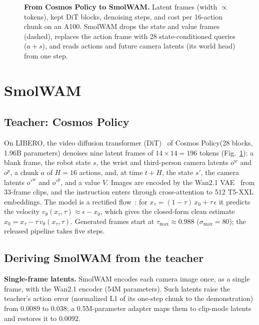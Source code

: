\documentclass{article}
\newcommand{\smol}{SmolWAM\xspace}
\newcommand{\cosmos}{Cosmos Policy\xspace}
\begin{document}
\begin{figure}[t]
\centering
\resizebox{\textwidth}{!}{}
\caption{\textbf{From \cosmos to \smol.} Latent frames (width $\propto$ tokens), kept DiT blocks, denoising steps, and cost per 16-action chunk on an A100. \smol drops the state and value frames (dashed), replaces the action frame with 28 state-conditioned queries ($a{+}s$), and reads actions and future camera latents (its world head) from one step.}
\label{fig:overview}
\end{figure}

\section{SmolWAM}
\label{sec:method}

\subsection{Teacher: Cosmos Policy}

On LIBERO, the video diffusion transformer (DiT)~\citep{peebles2023dit} of \cosmos (28 blocks, 1.96B parameters) denoises nine latent frames of $14{\times}14{=}196$ tokens (Fig.~\ref{fig:overview}): a blank frame, the robot state $s$, the wrist and third-person camera latents $o^{w}$ and $o^{p}$, a chunk $a$ of $H{=}16$ actions, and, at time $t{+}H$, the state $s'$, the camera latents $o'^{w}$ and $o'^{p}$, and a value $V$.
Images are encoded by the Wan2.1 VAE~\citep{wan2025} from 33-frame clips, and the instruction enters through cross-attention to 512 T5-XXL embeddings.
The model is a rectified flow~\citep{liu2023rectifiedflow,lipman2023flowmatching}: for $x_\tau=(1-\tau)\,x_0+\tau\,\epsilon$ it predicts the velocity $v_\theta(x_\tau,\tau)\approx\epsilon-x_0$, which gives the closed-form clean estimate $\hat{x}_0 = x_\tau - \tau\, v_\theta(x_\tau,\tau)$.
Generated frames start at $\tau_{\max}\approx0.988$ ($\sigma_{\max}{=}80$); the released pipeline takes five steps.

\subsection{Deriving SmolWAM from the teacher}
\label{sec:derivation}

\textbf{Single-frame latents.}
\smol encodes each camera image once, as a single frame, with the Wan2.1 encoder (54M parameters).
Such latents raise the teacher's action error (normalized L1 of its one-step chunk to the demonstration) from 0.0089 to 0.038; a 0.5M-parameter adapter maps them to clip-mode latents and restores it to 0.0092.
\end{document}
